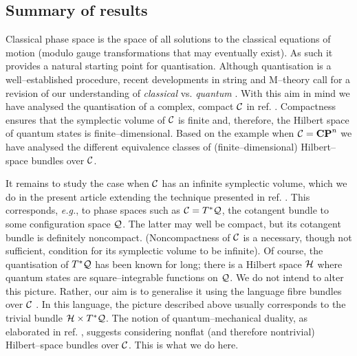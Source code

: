 \documentclass[a4paper,a4paper]{article}
\begin{document}
\subsection{Summary of results}\label{ssmmrr}


Classical phase space is the space of all solutions to the classical equations 
of motion (modulo gauge transformations that may eventually exist). As such it provides 
a natural starting point for quantisation. Although quantisation is a well--established procedure, 
recent developments in string and M--theory call for a revision of our understanding of 
{\it classical}\/ vs. {\it quantum} \cite{VAFA}. With this aim in mind we have analysed 
the quantisation of a complex, compact ${\cal C}$ in ref. \cite{PQM}. Compactness ensures that 
the symplectic volume of ${\cal C}$ is finite and, therefore, the Hilbert space of quantum states 
is finite--dimensional. Based on the example when ${\cal C}={\bf CP}^n$ we have analysed 
the different equivalence classes of (finite--dimensional) Hilbert--space bundles over ${\cal C}$. 

It remains to study the case when ${\cal C}$ has an infinite symplectic volume,
which we do in the present article extending the technique presented in ref. \cite{PQM}.
This corresponds, {\it e.g.}, to phase spaces such as ${\cal C}=T^*{\cal Q}$, the cotangent 
bundle to some configuration space ${\cal Q}$. The latter may well be compact, but its 
cotangent bundle is definitely noncompact. (Noncompactness of ${\cal C}$ is a necessary, 
though not sufficient, condition for its symplectic volume to be infinite). 
Of course, the quantisation of $T^*{\cal Q}$ has been known for long; there is a 
Hilbert space ${\cal H}$ where quantum states are square--integrable functions 
on ${\cal Q}$. We do not intend to alter this picture. Rather, our aim is 
to generalise it using the language fibre bundles over ${\cal C}$ 
\cite{REUTER}. In this 
language, the picture described above usually corresponds to the trivial bundle 
${\cal H}\times T^*{\cal Q}$. The notion of quantum--mechanical duality, as elaborated 
in ref. \cite{PQM}, suggests considering nonflat (and therefore nontrivial) Hilbert--space 
bundles over ${\cal C}$. This is what we do here.
\end{document}

